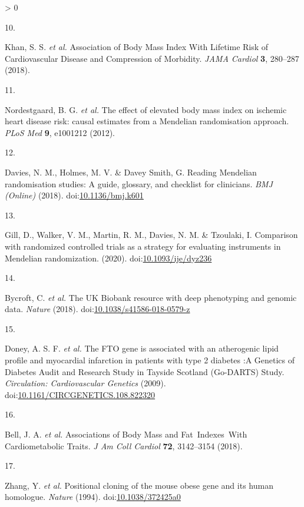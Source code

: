 \documentclass[11pt,twoside]{bristolthesis}
\newlength{\cslhangindent}
\newlength{\csllabelwidth}
\newenvironment{CSLReferences}[2] %
 {%
  \setlength{\parindent}{0pt}
  \ifodd #1 \everypar{\setlength{\hangindent}{\cslhangindent}}\ignorespaces\fi
  \ifnum #2 > 0
  \setlength{\parskip}{#2\baselineskip}
  \fi
 }%
 {}
\newcommand{\CSLLeftMargin}[1]{\parbox[t]{\csllabelwidth}{#1}}
\newcommand{\CSLRightInline}[1]{\parbox[t]{\linewidth - \csllabelwidth}{#1}\break}
\begin{document}
\begin{CSLReferences}{0}{0}
\leavevmode\hypertarget{ref-Khan2018}{}%
\CSLLeftMargin{10. }
\CSLRightInline{Khan, S. S. \emph{et al.} {Association of Body Mass Index With Lifetime Risk of Cardiovascular Disease and Compression of Morbidity}. \emph{JAMA Cardiol} \textbf{3}, 280--287 (2018).}

\leavevmode\hypertarget{ref-Nordestgaard2012}{}%
\CSLLeftMargin{11. }
\CSLRightInline{Nordestgaard, B. G. \emph{et al.} {The effect of elevated body mass index on ischemic heart disease risk: causal estimates from a Mendelian randomisation approach}. \emph{PLoS Med} \textbf{9}, e1001212 (2012).}

\leavevmode\hypertarget{ref-Davies2018}{}%
\CSLLeftMargin{12. }
\CSLRightInline{Davies, N. M., Holmes, M. V. \& Davey Smith, G. {Reading Mendelian randomisation studies: A guide, glossary, and checklist for clinicians}. \emph{BMJ (Online)} (2018). doi:\href{https://doi.org/10.1136/bmj.k601}{10.1136/bmj.k601}}

\leavevmode\hypertarget{ref-Gill2020}{}%
\CSLLeftMargin{13. }
\CSLRightInline{Gill, D., Walker, V. M., Martin, R. M., Davies, N. M. \& Tzoulaki, I. {Comparison with randomized controlled trials as a strategy for evaluating instruments in Mendelian randomization}. (2020). doi:\href{https://doi.org/10.1093/ije/dyz236}{10.1093/ije/dyz236}}

\leavevmode\hypertarget{ref-Bycroft2018}{}%
\CSLLeftMargin{14. }
\CSLRightInline{Bycroft, C. \emph{et al.} {The UK Biobank resource with deep phenotyping and genomic data}. \emph{Nature} (2018). doi:\href{https://doi.org/10.1038/s41586-018-0579-z}{10.1038/s41586-018-0579-z}}

\leavevmode\hypertarget{ref-Doney2009}{}%
\CSLLeftMargin{15. }
\CSLRightInline{Doney, A. S. F. \emph{et al.} {The FTO gene is associated with an atherogenic lipid profile and myocardial infarction in patients with type 2 diabetes :A Genetics of Diabetes Audit and Research Study in Tayside Scotland (Go-DARTS) Study}. \emph{Circulation: Cardiovascular Genetics} (2009). doi:\href{https://doi.org/10.1161/CIRCGENETICS.108.822320}{10.1161/CIRCGENETICS.108.822320}}

\leavevmode\hypertarget{ref-Bell2018}{}%
\CSLLeftMargin{16. }
\CSLRightInline{Bell, J. A. \emph{et al.} {Associations of Body Mass and Fat~Indexes~With Cardiometabolic Traits}. \emph{J Am Coll Cardiol} \textbf{72}, 3142--3154 (2018).}

\leavevmode\hypertarget{ref-Zhang1994}{}%
\CSLLeftMargin{17. }
\CSLRightInline{Zhang, Y. \emph{et al.} {Positional cloning of the mouse obese gene and its human homologue}. \emph{Nature} (1994). doi:\href{https://doi.org/10.1038/372425a0}{10.1038/372425a0}}


\end{CSLReferences}
\end{document}
